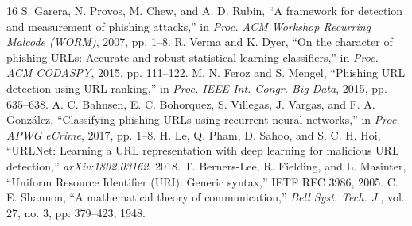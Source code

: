 \documentclass[conference]{IEEEtran}
\begin{document}
\begin{thebibliography}{16}
 S. Garera, N. Provos, M. Chew, and A. D. Rubin, ``A framework for detection and measurement of phishing attacks,'' in \textit{Proc. ACM Workshop Recurring Malcode (WORM)}, 2007, pp. 1--8.
 R. Verma and K. Dyer, ``On the character of phishing URLs: Accurate and robust statistical learning classifiers,'' in \textit{Proc. ACM CODASPY}, 2015, pp. 111--122.
 M. N. Feroz and S. Mengel, ``Phishing URL detection using URL ranking,'' in \textit{Proc. IEEE Int. Congr. Big Data}, 2015, pp. 635--638.
 A. C. Bahnsen, E. C. Bohorquez, S. Villegas, J. Vargas, and F. A. Gonz{\'a}lez, ``Classifying phishing URLs using recurrent neural networks,'' in \textit{Proc. APWG eCrime}, 2017, pp. 1--8.
 H. Le, Q. Pham, D. Sahoo, and S. C. H. Hoi, ``URLNet: Learning a URL representation with deep learning for malicious URL detection,'' \textit{arXiv:1802.03162}, 2018.
 T. Berners-Lee, R. Fielding, and L. Masinter, ``Uniform Resource Identifier (URI): Generic syntax,'' IETF RFC 3986, 2005.
 C. E. Shannon, ``A mathematical theory of communication,'' \textit{Bell Syst. Tech. J.}, vol. 27, no. 3, pp. 379--423, 1948.
\end{thebibliography}
\end{document}
